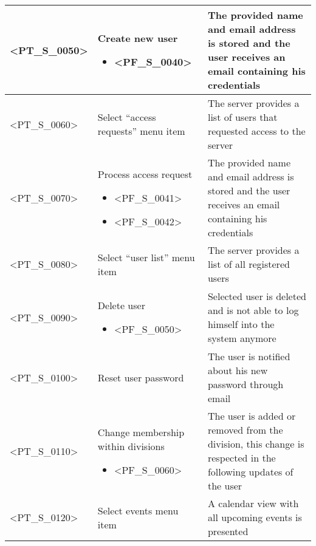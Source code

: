 \begin{longtable} {| p{} | p{} | p{} |}
    <PT\_S\_0050> & 
    Create new user
        \begin{itemize} 
            \item <PF\_S\_0040>
        \end{itemize} & 
    The provided name and email address is stored and the user receives an email containing his credentials \\ \hline
    
    <PT\_S\_0060> & 
    Select \enquote{access requests} menu item &
    The server provides a list of users that requested access to the server \\ \hline
    
    <PT\_S\_0070> & 
    Process access request
        \begin{itemize} 
            \item <PF\_S\_0041>
            \item <PF\_S\_0042>
        \end{itemize} & 
    The provided name and email address is stored and the user receives an email containing his credentials \\ \hline
    
    <PT\_S\_0080> & 
    Select \enquote{user list} menu item &
    The server provides a list of all registered users \\ \hline
    
    <PT\_S\_0090> & 
    Delete user
        \begin{itemize} 
            \item <PF\_S\_0050>
        \end{itemize} & 
    Selected user is deleted and is not able to log himself into the system anymore \\ \hline
    
    <PT\_S\_0100> & 
    Reset user password & 
    The user is notified about his new password through email \\ \hline
    
    <PT\_S\_0110> & 
    Change membership within divisions
        \begin{itemize} 
            \item <PF\_S\_0060>
        \end{itemize} & 
    The user is added or removed from the division, this change is respected in the following updates of the user \\ \hline
    
    <PT\_S\_0120> & 
    Select events menu item &
    A calendar view with all upcoming events is presented \\ \hline
    

\end{longtable}
